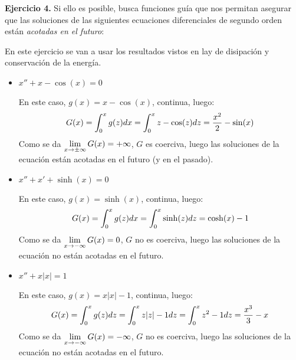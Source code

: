 \documentclass[12pt]{article}
\theoremstyle{definition}
\theoremstyle{remark}
\begin{document}
\medskip

\textbf{Ejercicio 4.} Si ello es posible, busca funciones guía que nos permitan asegurar que las soluciones de las siguientes ecuaciones diferenciales de segundo orden están \textit{acotadas en el futuro}:

En este ejercicio se van a usar los resultados vistos en lay de disipación y conservación de la energía.

\begin{itemize}
\item $x''+x-\cos(x)=0$

En este caso, $g(x)=x-\cos(x)$, continua, luego:
\[
G(x)=\displaystyle\int_{ 0 }^{ x } g(z)dx=\displaystyle\int_{ 0 }^{ x } z-\cos(z)dz=\frac{x^2}{2}-\sin(x)
\]
Como se da $\displaystyle\lim_{ x \to \pm\infty } G(x)=+\infty$, $G$ es coerciva, luego las soluciones de la ecuación están acotadas en el futuro (y en el pasado).

\item $x''+x'+\sinh(x)=0$

En este caso, $g(x)=\sinh(x)$, continua, luego:
\[
G(x)=\displaystyle\int_{ 0 }^{ x } g(z)dx=\displaystyle\int_{ 0 }^{ x } \sinh(z)dz=\cosh(x)-1
\]
Como se da $\displaystyle\lim_{ x \to -\infty } G(x)=0$, $G$ no es coerciva, luego las soluciones de la ecuación no están acotadas en el futuro.

\item $x''+x|x|=1$

En este caso, $g(x)=x|x|-1$, continua, luego:
\[
G(x)=\displaystyle\int_{ 0 }^{ x } g(z)dz=\displaystyle\int_{ 0 }^{ x } z|z|-1dz=\displaystyle\int_{ 0 }^{ x } z^2-1dz=\frac{x^3}{3}-x
\]
Como se da $\displaystyle\lim_{ x \to -\infty } G(x)=-\infty$, $G$ no es coerciva, luego las soluciones de la ecuación no están acotadas en el futuro.
\end{itemize}
\end{document}

